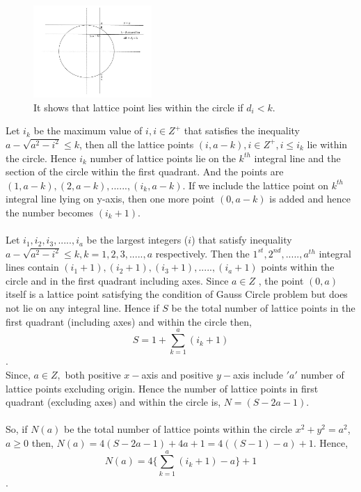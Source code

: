 \documentclass[journal,twoside]{IEEEtran}
\begin{document}
\begin{figure}[h]
\caption{It shows that lattice point lies within the circle if $d_{i}<k$.}
\centering
\includegraphics[width=0.4\textwidth]{diag1}
\end{figure}
Let $i_{k}$ be the maximum value of $i, i \in Z^{+}$ that satisfies the inequality $a- \sqrt{a^{2}-i^{2}} \leq k$, then all the lattice points $(i,a-k), i \in Z^{+}, i \leq i_{k}$ lie within the circle. Hence $i_{k}$ number of lattice points lie on the $k^{th}$ integral line and the section of the circle within the first quadrant. And the points are $(1,a-k), (2,a-k),......, (i_{k},a-k)$. If we include the lattice point on $k^{th}$ integral line lying on y-axis, then one more point $(0,a-k)$ is added and hence the number becomes $(i_{k}+1)$.
\\\\Let $i_{1},i_{2},i_{3},.....,i_{a}$ be the largest integers ($i$) that satisfy inequality $a- \sqrt{a^{2}-i^{2}} \leq k, k=1,2,3,.....,a$ respectively. Then the $1^{st},2^{nd},.....,a^{th}$ integral lines contain $(i_{1}+1),(i_{2}+1),(i_{3}+1),.....,(i_{a}+1)$ points within the circle and in the first quadrant including axes. Since $a \in Z$ , the point $(0,a)$ itself is a lattice point satisfying the condition of Gauss Circle problem but does not lie on any integral line. Hence if $S$ be the total number of lattice points in the first quadrant (including axes) and within the circle then,$$ S=1+ \sum_{k=1}^{a} (i_{k}+1)$$.
\\Since, $a\in Z,$ both positive $x-$axis and positive $y-$axis include $'a'$ number of lattice points excluding origin. Hence the number of lattice points in first quadrant (excluding axes) and within the circle is, $N= (S-2a-1)$.
\\\\So, if $N(a)$ be the total number of lattice points within the circle $x^{2}+y^{2}=a^{2}$, $a \geq 0$ then,
$N(a)=4(S-2a-1)+4a+1 = 4((S-1)-a)+1$.
Hence, $$N(a)=4\bigg\{\sum_{k=1}^{a}(i_{k}+1)-a\bigg\}+1$$.
\end{document}
